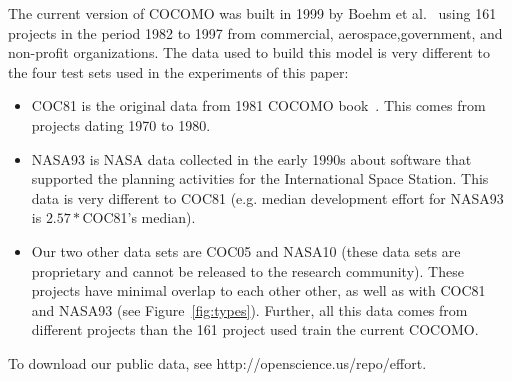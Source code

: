 \documentclass{sig-alternate}
\newcommand{\bi}{\begin{itemize}[leftmargin=0.4cm]}
\newcommand{\ei}{\end{itemize}}
\newcommand{\fig}[1]{Figure~\ref{fig:#1}}
\begin{document}
The current version of COCOMO was built in 1999 by Boehm et al.~\cite{boehm00b}  using  161 projects in the period 1982 to 1997 from commercial, aerospace,government, and non-profit organizations. 
The data used to build this model is very different to the four test sets used in the experiments
of this paper: 
\bi
\item COC81 is the original data from 1981 COCOMO book~\cite{boehm81}. 
This comes from projects dating 1970 to 1980.
\item NASA93 is NASA data collected  in the early 1990s
 about software that supported  the planning activities for the International
Space Station. This
data is very different to COC81 (e.g.  median development effort for NASA93
is $2.57*$COC81's median).
\item 
Our two other data sets are COC05 and NASA10 (these data sets
are proprietary and 
cannot be released to the research community). These projects have minimal overlap
to each other other,
as well as with COC81 and NASA93 (see \fig{types}).  
Further, all this data comes from different projects than the 161 project used train the current  COCOMO.
\ei
To download our public data, see http://openscience.us/repo/effort.
\end{document}
